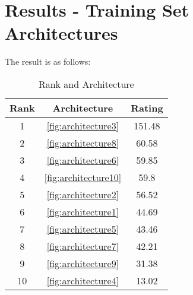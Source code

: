 \section{Results - Training Set Architectures}

The result is as follows:

\begin{table}[h]
    \label{table:survey}
    \centering
    \caption{Rank and Architecture}
    \begin{tabular}{ |c|c|c| } 
    \hline
    Rank & Architecture & Rating\\
    \hline
    1 & \ref{fig:architecture3} & 151.48\\
    2 & \ref{fig:architecture8} & 60.58\\
    3 & \ref{fig:architecture6} & 59.85\\
    4 & \ref{fig:architecture10} & 59.8\\
    5 & \ref{fig:architecture2} & 56.52\\
    6 & \ref{fig:architecture1} & 44.69\\
    7 & \ref{fig:architecture5} & 43.46\\
    8 & \ref{fig:architecture7} & 42.21\\
    9 & \ref{fig:architecture9} & 31.38\\
    10 & \ref{fig:architecture4} & 13.02\\
    \hline
    \end{tabular}
\end{table}
